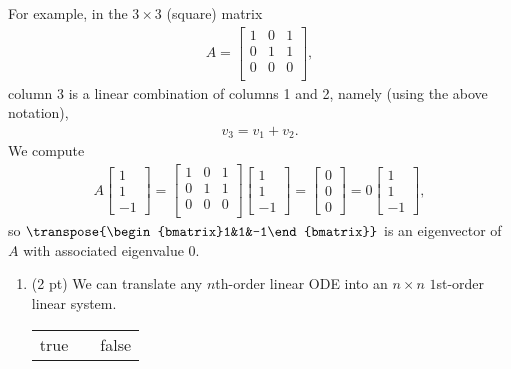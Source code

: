 {For example, in the $3 \times 3$ (square) matrix
\begin{align*}
A
=
\begin{bmatrix}
1	&	0	&	1	\\
0	&	1	&	1	\\
0	&	0	&	0	\\
\end{bmatrix}%
,
\end{align*}
column 3 is a linear combination of columns 1 and 2, namely (using the above notation),
\begin{align*}
v_{3}
=
v_{1} + v_{2}.
\end{align*}
We compute
\begin{align*}
A
\begin{bmatrix}
1	\\
1	\\
-1
\end{bmatrix}%
=
\begin{bmatrix}
1	&	0	&	1	\\
0	&	1	&	1	\\
0	&	0	&	0	\\
\end{bmatrix}%
\begin{bmatrix}
1	\\
1	\\
-1
\end{bmatrix}%
=
\begin{bmatrix}
0	\\
0	\\
0
\end{bmatrix}%
=
0
\begin{bmatrix}
1	\\
1	\\
-1
\end{bmatrix}%
,
\end{align*}
so $\transpose{\begin{bmatrix}1&1&-1\end{bmatrix}}$ is an eigenvector of $A$ with associated eigenvalue $0$.}%



\begin{enumerate}[resume,label=(\alph*)]
\item\label{itm : E3Q1c} (2 pt) We can translate any $n$th-order linear ODE into an $n \times n$ $1$st-order linear system.
\begin{center}
\begin{tabular}{c c c}
true	&	\hspace{1in}	&	false
\end{tabular}
\end{center}
\end{enumerate}

